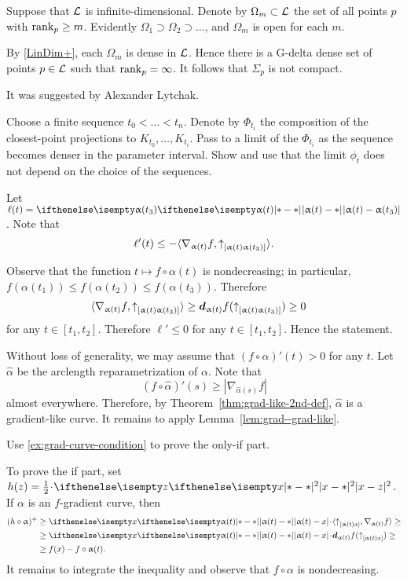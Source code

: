 Suppose that $\mathcal{L}$ is infinite-dimensional.
Denote by $\Omega_m\subset \spc{L}$ the set of all points $p$ with $\rank_p\ge m$.
Evidently $\Omega_1\supset \Omega_2\supset\dots$, and $\Omega_m$ is open for each $m$.

By \ref{LinDim+}, each $\Omega_m$ is dense in $\mathcal{L}$.
Hence there is a G-delta dense set of points $p\in\spc{L}$ such that $\mathop{\rm rank}\nolimits_p=\infty$.
It follows that $\Sigma_p$ is not compact.

 It was suggested by Alexander Lytchak.

Choose a finite sequence $t_0<\dots<t_n$.
Denote by $\Phi_{t_i}$ the composition of the closest-point projections to $K_{t_0},\dots, K_{t_i}$.
Pass to a limit of the $\Phi_{t_i}$ as the sequence becomes denser in the parameter interval. 
Show and use that the limit $\phi_t$ does not depend on the choice of the sequences. 


Let $\ell(t)=\dist{\alpha(t)}{\alpha(t_3)}{}$.
Note that 
\[\ell'(t)\le -\langle \nabla_{\alpha(t)}f,\dir{\alpha(t)}{\alpha(t_3)}\rangle.\]

Observe that the function $t\mapsto f\circ\alpha(t)$ is nondecreasing;
in particular, $f(\alpha(t_1))\le f(\alpha(t_2))\le f(\alpha(t_3))$.
Therefore 
\begin{align*}\langle \nabla_{\alpha(t)}f,\dir{\alpha(t)}{\alpha(t_3)}\rangle&\ge\dd_{\alpha(t)}f(\dir{\alpha(t)}{\alpha(t_3)})\ge 0
\end{align*}
for any $t\in[t_1,t_2]$.
Therefore $\ell'\le 0$ for any $t\in[t_1,t_2]$.
Hence the statement.

Without loss of generality, we may assume that $(f\circ\alpha)'(t)>0$ for any $t$.
Let $\hat\alpha$ be the arclength reparametrization of $\alpha$.
Note that 
\[(f\circ\hat\alpha)'(s)\ge |\nabla_{\hat\alpha(s)}f|\]
almost everywhere.
Therefore, by Theorem~\ref{thm:grad-like-2nd-def}, $\hat\alpha$ is a gradient-like curve.
It remains to apply Lemma~\ref{lem:grad--grad-like}.

Use \ref{ex:grad-curve-condition} to prove the only-if part.

To prove the if part, set $h(z)=\tfrac12\cdot\dist[2]{x}{z}{}$.
If $\alpha$ is an $f$-gradient curve, then 
\begin{align*}
(h\circ\alpha)^+&\ge \dist{\alpha(t)}{x}{}\cdot\langle\dir{\alpha(t)}{x},\nabla_{\alpha(t)}f\rangle\ge
\\
&\ge \dist{\alpha(t)}{x}{}\cdot\dd_{\alpha(t)}f(\dir{\alpha(t)}{x})\ge 
\\
&\ge f(x)-f\circ\alpha(t).
\end{align*}
It remains to integrate the inequality and observe that $f\circ\alpha$ is nondecreasing.

